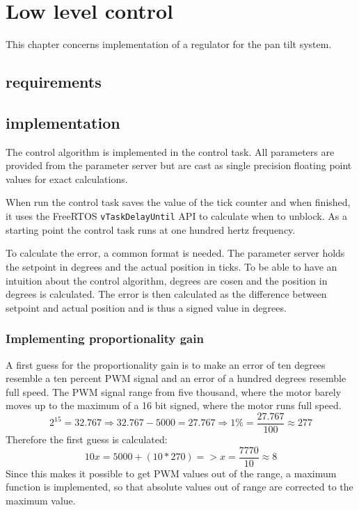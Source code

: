\chapter{Low level control}\label{chap:llc}

This chapter concerns implementation of a regulator for the pan tilt system.

\section{requirements}

\section{implementation}
The control algorithm is implemented in the control task. All parameters are provided from the parameter server but are cast as single precision floating point values for exact calculations.

When run the control task saves the value of the tick counter and when finished, it uses the FreeRTOS \texttt{vTaskDelayUntil} API to calculate when to unblock. As a starting point the control task runs at one hundred hertz frequency.

To calculate the error, a common format is needed. The parameter server holds the setpoint in degrees and the actual position in ticks. To be able to have an intuition about the control algorithm, degrees are cosen and the position in degrees is calculated. The error is then calculated as the difference between setpoint and actual position and is thus a signed value in degrees.

\subsection{Implementing proportionality gain}
A first guess for the proportionality gain is to make an error of ten degrees resemble a ten percent PWM signal and an error of a hundred degrees resemble full speed. The PWM signal range from five thousand, where the motor barely moves up to the maximum of a 16 bit signed, where the motor runs full speed.
\begin{equation}
2^{15} = 32.767 \Rightarrow 
32.767 - 5000 = 27.767 \Rightarrow 
1 \% = \frac{27.767}{100} \approx  277
	\label{eq:PWM}
\end{equation}
 Therefore the first guess is calculated:
\begin{equation}
10x = 5000 + (10 * 270) => x = \frac{7770}{10} \approx  8
	\label{eq:P-term}
\end{equation}
Since this makes it possible to get PWM values out of the range, a maximum function is implemented, so that absolute values out of range are corrected to the maximum value.

